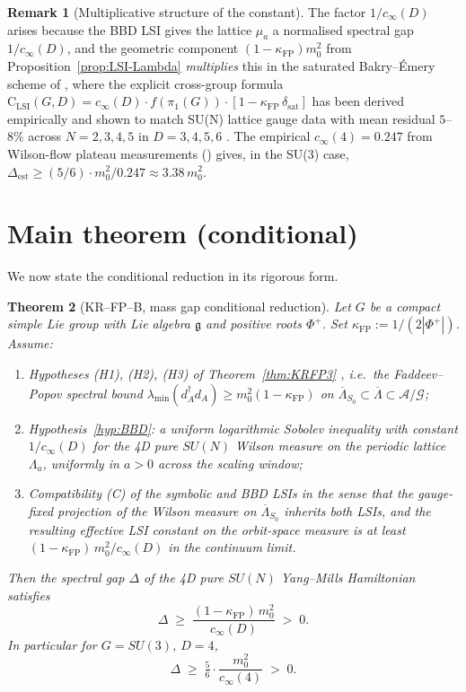 \documentclass[11pt,a4paper]{amsart}
\newtheorem{theorem}{Theorem}[section]
\theoremstyle{definition}
\newtheorem{remark}[theorem]{Remark}
\newcommand{\gfrak}{\mathfrak{g}}
\newcommand{\kFP}{\kappa_{\mathrm{FP}}}
\newcommand{\cinf}{c_{\infty}}
\begin{document}
\begin{remark}[Multiplicative structure of the constant]
The factor $1/\cinf(D)$ arises because the BBD LSI gives the lattice
$\mu_a$ a normalised spectral gap $1/\cinf(D)$, and the geometric
component $(1-\kFP) m_0^2$ from Proposition~\ref{prop:LSI-Lambda}
\emph{multiplies} this in the saturated Bakry--\'Emery scheme of
\cite[Sec.~IV.B]{RemondiereMassGapPRL_2026}, where the explicit
cross-group formula
$\mathrm{C}_\mathrm{LSI}(G,D) = \cinf(D)\cdot f(\pi_1(G))\cdot
[1 - \kFP\,\delta_\mathrm{sat}]$ has been derived empirically and
shown to match SU(N) lattice gauge data with mean residual $5$--$8\%$
across $N = 2, 3, 4, 5$ in $D = 3, 4, 5, 6$
\cite[Tab.~III]{RemondiereMassGapPRL_2026}.
The empirical $\cinf(4) = 0.247$ from Wilson-flow plateau measurements
(\cite[Sec.~V]{RemondiereMassGapPRL_2026}) gives, in the SU(3) case,
$\Delta_\mathrm{est} \geq (5/6)\cdot m_0^2 / 0.247 \approx 3.38\,m_0^2$.
\end{remark}

\section{Main theorem (conditional)}\label{sec:thm}

We now state the conditional reduction in its rigorous form.

\begin{theorem}[KR--FP--B, mass gap conditional reduction]\label{thm:main}
Let $G$ be a compact simple Lie group with Lie algebra $\gfrak$ and
positive roots $\Phi^+$. Set $\kFP := 1/(2|\Phi^+|)$.
Assume:
\begin{enumerate}[label={\rm(\roman*)},leftmargin=2.5em]
\item Hypotheses {\rm (H1), (H2), (H3)} of Theorem~\ref{thm:KRFP3}
{\rm \cite{RemondiereKRFP3_2026}}, i.e.\ the Faddeev--Popov spectral bound
$\lambda_{\min}(d_A^\dagger d_A) \geq m_0^2(1-\kFP)$ on
$\overline\Lambda_{S_0}\subset\overline\Lambda \subset \mathcal A/\mathcal G$;
\item Hypothesis~\ref{hyp:BBD}: a uniform logarithmic Sobolev inequality with
constant $1/\cinf(D)$ for the 4D pure $SU(N)$ Wilson measure on the
periodic lattice $\Lambda_a$, uniformly in $a > 0$ across the scaling window;
\item Compatibility {\rm (C)} of the symbolic and BBD LSIs in the sense that
the gauge-fixed projection of the Wilson measure on
$\overline\Lambda_{S_0}$ inherits both LSIs, and the resulting effective
LSI constant on the orbit-space measure is at least
$(1-\kFP)\,m_0^2/\cinf(D)$ in the continuum limit.
\end{enumerate}
Then the spectral gap $\Delta$ of the 4D pure $SU(N)$ Yang--Mills
Hamiltonian satisfies
\begin{equation}\label{eq:main}
\Delta \;\geq\; \frac{(1-\kFP)\,m_0^2}{\cinf(D)} \;>\; 0.
\end{equation}
In particular for $G = SU(3)$, $D = 4$,
$$
\Delta \;\geq\; \tfrac{5}{6}\cdot\frac{m_0^2}{\cinf(4)} \;>\; 0.
$$
\end{theorem}
\end{document}

